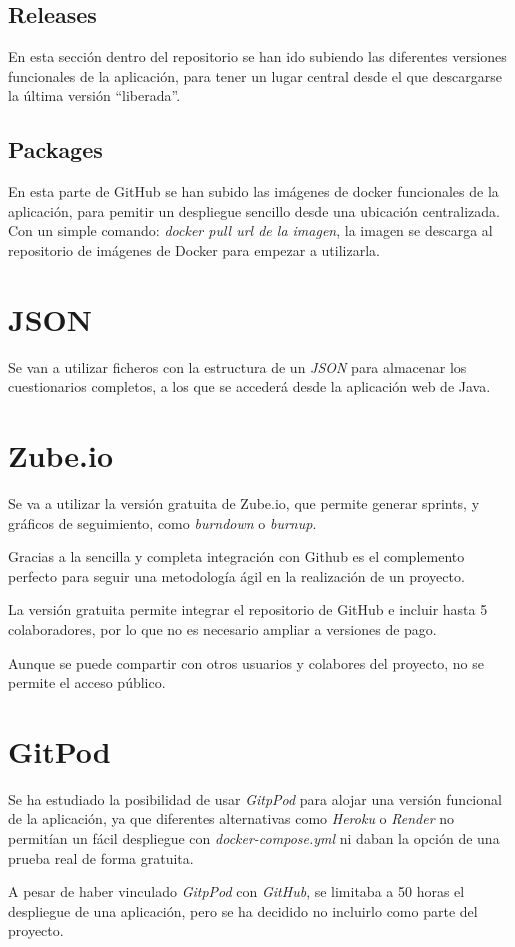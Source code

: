 \subsection{Releases}

En esta sección dentro del repositorio se han ido subiendo las diferentes versiones funcionales de la aplicación, para tener un lugar central desde el que descargarse la última versión ``liberada''.

\subsection{Packages}

En esta parte de GitHub se han subido las imágenes de docker funcionales de la aplicación, para pemitir un despliegue sencillo desde una ubicación centralizada.
Con un simple comando: \textit{docker pull url de la imagen}, la imagen se descarga al repositorio de imágenes de Docker para empezar a utilizarla.

\section{JSON}

Se van a utilizar ficheros con la estructura de un \textit{JSON} para almacenar los cuestionarios completos, a los que se accederá desde la aplicación web de Java.

\section{Zube.io}

Se va a utilizar la versión gratuita de Zube.io, que permite generar sprints, y gráficos de seguimiento, como \textit{burndown} o \textit{burnup}.

Gracias a la sencilla y completa integración con Github es el complemento perfecto para seguir una metodología ágil en la realización de un proyecto.

La versión gratuita permite integrar el repositorio de GitHub e incluir hasta 5 colaboradores, por lo que no es necesario ampliar a versiones de pago.

Aunque se puede compartir con otros usuarios y colabores del proyecto, no se permite el acceso público.

\section{GitPod}

Se ha estudiado la posibilidad de usar \textit{GitpPod} para alojar una versión funcional de la aplicación, ya que diferentes alternativas como \textit{Heroku} o \textit{Render} no permitían un fácil despliegue con \textit{docker-compose.yml} ni daban la opción de una prueba real de forma gratuita.

A pesar de haber vinculado \textit{GitpPod} con \textit{GitHub}, se limitaba a 50 horas el despliegue de una aplicación, pero se ha decidido no incluirlo como parte del proyecto.








